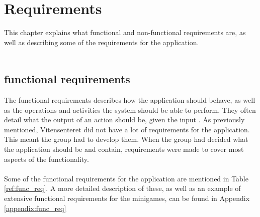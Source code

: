 \chapter{Requirements}

This chapter explains what functional and non-functional requirements are, as well as describing some of the requirements for the application.\\
\\



\section{functional requirements}
The functional requirements describes how the application should behave, as well as the operations and activities the system should be able to perform. They often detail what the output of an action should be, given the input \cite{OFNIS}. As previously mentioned, Vitensenteret did not have a lot of requirements for the application. This meant the group had to develop them. When the group had decided what the application should be and contain, requirements were made to cover most aspects of the functionality.\\
\\
Some of the functional requirements for the application are mentioned in Table \ref{ref:func_req}. A more detailed description of these, as well as an example of extensive functional requirements for the minigames, can be found in Appendix \ref{appendix:func_req}

